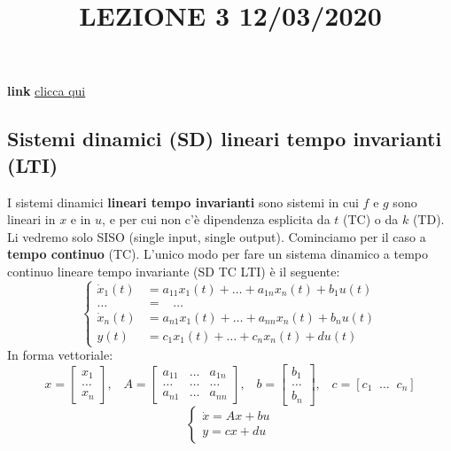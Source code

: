\title{LEZIONE 3 12/03/2020}\newline
\textbf{link} \href{https://web.microsoftstream.com/video/0f5f35c0-ba36-4f9c-a496-057ebab138ec?list=user&userId=faa91214-a6f5-40d7-8875-253fd49b8ce1}{clicca qui}
\subsection{Sistemi dinamici (SD) lineari tempo invarianti (LTI)}
I sistemi dinamici \textbf{lineari tempo invarianti} sono sistemi in cui $f$ e $g$ sono lineari in $x$ e in $u$, e per cui non c'è dipendenza esplicita da $t$ (TC) o da $k$ (TD).\newline
\newline
Li vedremo solo SISO (single input, single output).\newline
\newline
Cominciamo per il caso a \textbf{tempo continuo} (TC). L'unico modo per fare un sistema dinamico a tempo continuo lineare tempo invariante (SD TC LTI) è il seguente:
\[
    \begin{cases}
        \dot{x}_1(t) &= a_{11}x_1(t) + \dots+ a_{1n}x_{n}(t) + b_1 u(t)\\
        \dots &= \;\;\; \dots\\
        \dot{x}_n(t) &= a_{n1}x_1(t) +\dots+ a_{nn}x_n(t) + b_nu(t)\\
        y(t) &= c_1x_1(t) + \dots + c_n x_n(t) + d u(t)
    \end{cases}
\]
In forma vettoriale:
\[
    x = \left[\begin{matrix}
        x_1\\
        \dots\\
        x_n
    \end{matrix}\right], \;\;\; A = \left[\begin{matrix}
        a_{11} & \dots & a_{1n}\\
        \dots & \dots & \dots\\
        a_{n1} & \dots & a_{nn}
    \end{matrix}\right], \;\;\; b = \left[\begin{matrix}
        b_1\\
        \dots\\
        b_n
    \end{matrix}\right], \;\;\; c = [c_1 \;\; \dots \;\; c_n]
\]
\[
    \begin{cases}
        \dot{x} = Ax+bu\\
        y = cx +du
    \end{cases}
\]
